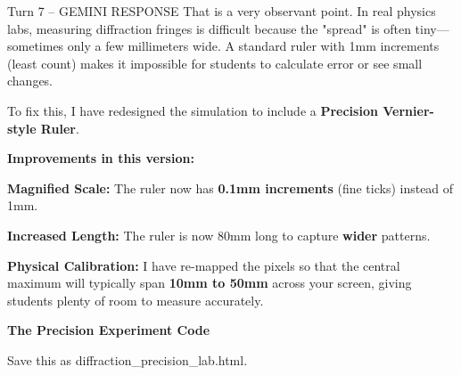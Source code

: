 \documentclass[10pt,a4paper]{article}
\begin{document}
\begin{aibox}{Turn 7 -- GEMINI RESPONSE}
That is a very observant point. In real physics labs, measuring diffraction fringes is difficult because the "spread" is often tiny—sometimes only a few millimeters wide. A standard ruler with 1mm increments (least count) makes it impossible for students to calculate error or see small changes.

To fix this, I have redesigned the simulation to include a \textbf{Precision Vernier-style Ruler}.

\textbf{\large Improvements in this version:}

\textbf{Magnified Scale:} The ruler now has \textbf{0.1mm increments} (fine ticks) instead of 1mm.

\textbf{Increased Length:} The ruler is now 80mm long to capture \textbf{wider} patterns.

\textbf{Physical Calibration:} I have re-mapped the pixels so that the central maximum will typically span \textbf{10mm to 50mm} across your screen, giving students plenty of room to measure accurately.

\textbf{\large The Precision Experiment Code}

Save this as diffraction\_precision\_lab.html.

\end{aibox}
\end{document}
